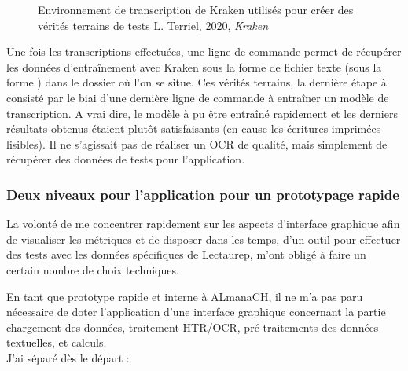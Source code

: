 \begin{figure}[H]
    \centering
    \centerline{}
    \caption{Environnement de transcription de Kraken utilisés pour créer des vérités terrains de tests \textcopyright L. Terriel, 2020, \textit{Kraken}}
    \label{fig:transcrire_kraken}
\end{figure}

Une fois les transcriptions effectuées, une ligne de commande permet de récupérer les données d'entraînement avec Kraken sous la forme de fichier texte (sous la forme ) dans le dossier où l'on se situe. Ces vérités terrains, la dernière étape à consisté par le biai d'une dernière ligne de commande à entraîner un modèle de transcription. A vrai dire, le modèle à pu être entraîné rapidement et les derniers résultats obtenus étaient plutôt satisfaisants (en cause les écritures imprimées lisibles). Il ne s'agissait pas de réaliser un OCR de qualité, mais simplement de récupérer des données de tests pour l'application.

\subsubsection{Deux niveaux pour l'application pour un prototypage rapide}

La volonté de me concentrer rapidement sur les aspects d'interface graphique afin de visualiser les métriques et de disposer dans les temps, d'un outil pour effectuer des tests avec les données spécifiques de Lectaurep, m'ont obligé à faire un certain nombre de choix techniques. 

En tant que prototype rapide et interne à ALmanaCH, il ne m'a pas paru nécessaire de doter l'application d'une interface graphique concernant la partie chargement des données, traitement HTR/OCR, pré-traitements des données textuelles, et calculs. \\

J'ai séparé dès le départ :

